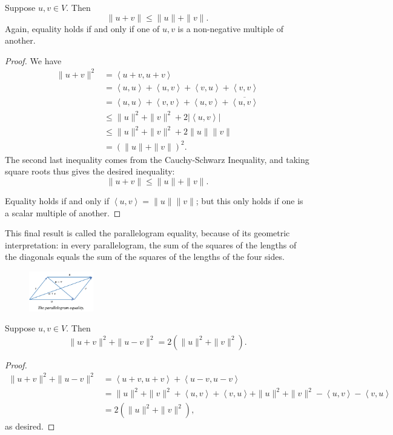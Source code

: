 \documentclass[math0540-lecture-notes.tex]{subfiles}
\begin{document}
\begin{proposition}{}
  Suppose $u,v\in V$. Then \[
    \|u+v\|\le \|u\|+\|v\|
  .\] Again, equality holds if and only if one of $u,v$ is a non-negative multiple of another.
\end{proposition}
\begin{proof}[Proof]
  We have
  \begin{align*}
    \|u+v\|^2&= \left<u+v,u+v \right> \\
             &= \left<u,u \right>+\left<u,v \right>+\left<v,u \right>+\left<v,v \right> \\
             &= \left<u,u \right>+\left<v,v \right>+\left<u,v \right> +\overline{\left<u,v \right>}\\
             &\le  \|u\|^2+\|v\|^2+2\left| \left<u,v \right> \right|  \\
             &\le \|u\|^2+\|v\|^2+2\|u\|\|v\| \\
             &= (\|u\|+\|v\|)^2
  .\end{align*}
  The second last inequality comes from the Cauchy-Schwarz Inequality, and taking square roots thus
  gives the desired inequality: \[
    \|u+v\|\le \|u\|+\|v\|
  .\] 

  Equality holds if and only if $\left<u,v \right> =\|u\|\|v\|$; but this only holds if one is a
  scalar multiple of another. 
\end{proof}

This final result is called the parallelogram equality, because of its geometric interpretation: in
every parallelogram, the sum of the squares of the lengths of the diagonals equals the sum of the
squares of the lengths of the four sides.
\begin{figure}[htpb]
  \centering
  \includegraphics[width=0.25\textwidth]{axler6aparallelogram.png}
\end{figure}
\begin{proposition}{}
  Suppose $u,v\in V$. Then \[
    \|u+v\|^2+\|u-v\|^2=2(\|u\|^2+\|v\|^2)
  .\] 
\end{proposition}
\begin{proof}[Proof]
  \begin{align*}
    \|u+v\|^2+\|u-v\|^2&= \left<u+v,u+v \right>+\left<u-v,u-v \right> \\
                       &= \|u\|^2+\|v\|^2+\left<u,v \right>+\left<v,u
                       \right>+\|u\|^2+\|v\|^2-\left<u,v \right>-\left<v,u \right>\\
                       &=2(\|u\|^2+\|v\|^2)
  ,\end{align*} as desired.
\end{proof}
\end{document}
